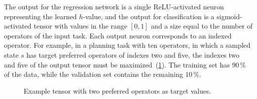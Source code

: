 \documentclass[ppgc,diss,english]{iiufrgs}
\begin{document}
The output for the regression network is a single ReLU-activated neuron representing the learned $h$-value, and the output for classification is a sigmoid-activated tensor with values in the range $[0, 1]$ and a size equal to the number of operators of the input task.
Each output neuron corresponds to an indexed operator. For example, in a planning task with ten operators, in which a sampled state $s$ has target preferred operators of indexes two and five, the indexes two and five of the output tensor must be maximized~(\cref{fig:po-tensor}). The training set has $90\,\%$ of the data, while the validation set contains the remaining $10\,\%$.

\begin{figure}[tb]
\caption[]{Example tensor with two preferred operators as target values.}
\vspace{\baselineskip}
\centering
{}
\label{fig:po-tensor}
\end{figure}


\end{document}
